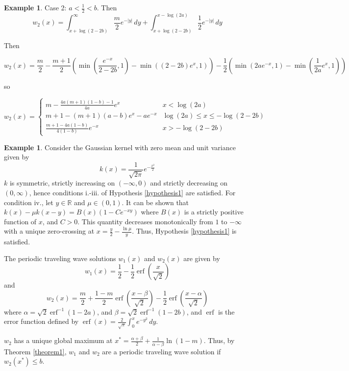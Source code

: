 \documentclass[11pt]{article}
\theoremstyle{definition}
\newtheorem{ex}[thm]{Example}
\numberwithin{equation}{section}
\numberwithin{thm}{section}
\DeclareMathOperator\erf{erf}
\begin{document}
\begin{ex}
Case 2: $a<\frac{1}{2}<b$. Then
$$ w_2(x) = \int_{x+\log(2-2b)}^{\infty} \frac{m}{2}e^{-|y|}\,dy + \int_{x+\log(2-2b)}^{x-\log(2a)} \frac{1}{2}e^{-|y|} \,dy $$

Then

$$ w_2(x) = \frac{m}{2} - \frac{m+1}{2}\left( \min(\frac{e^{-x}}{2-2b},1) - \min((2-2b)e^{x},1) \right) - \frac{1}{2} \left( \min(2ae^{-x},1) - \min(\frac{1}{2a}e^{x},1) \right) $$

so

$$ w_2(x) = \begin{cases}
\displaystyle
m - \frac{4a(m+1)(1-b)-1}{4a} e^x & x <\log(2a) \\
\displaystyle
m+1 - (m+1)(a-b) e^x - ae^{-x} & \log(2a) \leq x \leq -\log(2-2b) \\
\displaystyle
\frac{m+1-4a(1-b)}{4(1-b)} e^{-x}  & x > -\log(2-2b)
\end{cases} $$

\end{ex}

\begin{ex} Consider the Gaussian kernel with zero mean and unit variance given by
$$ k(x) = \frac{1}{\sqrt{2\pi}} e^{-\frac{x^2}{2}} $$
$k$ is symmetric, strictly increasing on $(-\infty,0)$ and strictly decreasing on $(0,\infty)$, hence conditions i.-iii. of Hypothesis \ref{hypothesis1} are satisfied. For condition iv., let $y \in \mathbb R$ and $\mu\in(0,1)$. It can be shown that $k(x) - \mu k(x-y) = B(x)(1-Ce^{-xy})$ where $B(x)$ is a strictly positive function of $x$, and $C>0$. This quantity decreases monotonically from $1$ to $-\infty$ with a unique zero-crossing at $x=\frac{y}{2}-\frac{\ln \mu}{y}$. Thus, Hypothesis \ref{hypothesis1} is satisfied.

The periodic traveling wave solutions $w_1(x)$ and $w_2(x)$ are given by
\begin{equation}
w_1(x) = \frac{1}{2} - \frac{1}{2}\erf\left(\frac{x}{\sqrt{2}}\right)
\end{equation}
and
\begin{equation}
w_2(x)=  \frac{m}{2} + \frac{1-m}{2} \erf \left( \frac{x-\beta}{\sqrt 2}\right) - \frac{1}{2} \erf \left( \frac{x-\alpha}{\sqrt2} \right)
\end{equation}
where $\alpha=\sqrt{2}\erf^{-1}\left(1-2a\right)$, and $\beta=\sqrt{2}\erf^{-1}\left(1-2b\right)$, and $\erf$ is the error function defined by $\erf(x) =\frac{2}{\sqrt\pi}\int_0^x e^{-y^2}\,dy$.

$w_2$ has a unique global maximum at $x^*=\frac{\alpha+\beta}{2} + \frac{1}{\alpha-\beta}\ln\left(1-m\right)$. Thus, by Theorem \ref{theorem1}, $w_1$ and $w_2$ are a periodic traveling wave solution if $w_2(x^*)\leq b$.
\end{ex}
\end{document}
